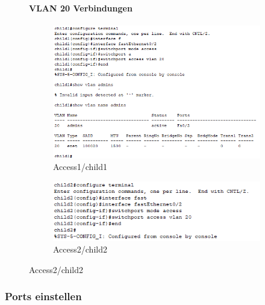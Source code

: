 \begin{figure}[!htb]
    \paragraph{VLAN 20 Verbindungen}
    \centering
    \begin{subfigure}{\textwidth}
        \includegraphics[width=\textwidth]{./img/Access1/admins.png}
        \caption{Access1/child1}
    \end{subfigure}
    \begin{subfigure}{\textwidth}
        \includegraphics[width=\textwidth]{./img/Access2/admin.png}
        \caption{Access2/child2}
    \end{subfigure}
\end{figure}
\FloatBarrier

\clearpage
\pagebreak
\subsubsection{Ports einstellen}

